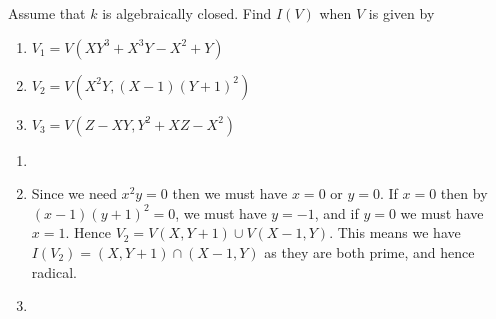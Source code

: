 \begin{problem}[1.8]
Assume that $k$ is algebraically closed. Find $I(V)$ when $V$ is given by
\begin{enumerate}
    \item $V_1 = V(XY^3+X^3Y-X^2+Y)$
    \item $V_2 = V(X^2Y, (X-1)(Y+1)^2)$
    \item $V_3 = V(Z-XY, Y^2+XZ-X^2)$
\end{enumerate}

\begin{solution}
\begin{enumerate}
    \item 
    \item Since we need $x^2y = 0$ then we must have $x=0$ or $y=0$. If $x=0$ then by $(x-1)(y+1)^2=0$, we must have $y=-1$, and if $y=0$ we must have $x=1$. Hence $V_2 = V(X, Y+1)\cup V(X-1, Y)$. This means we have $I(V_2)=(X, Y+1)\cap (X-1, Y)$ as they are both prime, and hence radical. 
    \item
\end{enumerate}
\end{solution}
\end{problem}



